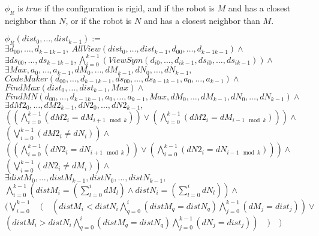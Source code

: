 \documentclass{article}
\begin{document}
$\phi_R$ is $true$ if the configuration is rigid, and if the robot is $M$ and has a closest neighbor than $N$, or if the robot is $N$ and has a closest neighbor than $M$.

\begin{center}

$\phi_R(dist_{0}, \ldots ,dist_{k-1}):=$\\
$\exists d_{00}, \ldots ,d_{k-1k-1},\ AllView(dist_{0}, \ldots ,dist_{k-1}, d_{00}, \ldots ,d_{k-1k-1})\land$\\
$\exists ds_{00}, \ldots ,ds_{k-1k-1}, \bigwedge_{i=0}^{k-1} (ViewSym(d_{i0}, \ldots , d_{ik-1}, ds_{i0}, \ldots , ds_{ik-1}))\land$\\
$\exists Max, a_{0}, \ldots , a_{k-1}, dM_{0}, \dots, dM_{k-1}, dN_{0}, \dots, dN_{k-1},$\\
$CodeMaker(d_{00}, \ldots ,d_{k-1k-1}, ds_{00}, \ldots ,ds_{k-1k-1}, a_{0}, \ldots , a_{k-1})\land$\\
$FindMax(dist_{0}, \ldots ,dist_{k-1}, Max) \land$\\
$FindMN(d_{00}, \ldots ,d_{k-1k-1}, a_{0}, \ldots , a_{k-1}, Max,  dM_{0}, \dots, dM_{k-1}, dN_{0}, \dots, dN_{k-1}) \land $\\
$\exists dM2_{0}, \dots, dM2_{k-1}, dN2_{0}, \dots, dN2_{k-1},$\\
$( (\bigwedge_{i = 0}^{k-1} (dM2_{i} = dM_{i+1 \mod{k}}) ) \lor (\bigwedge_{i = 0}^{k-1} (dM2_{i} = dM_{i-1 \mod{k}})) ) \land$\\
$(\bigvee_{i = 0}^{k-1} (dM2_{i} \not= dN_{i}) ) \land $\\
$( (\bigwedge_{i = 0}^{k-1} (dN2_{i} = dN_{i+1 \mod{k}}) ) \lor (\bigwedge_{i = 0}^{k-1} (dN2_{i} = dN_{i-1 \mod{k}})) ) \land$\\
$(\bigvee_{i = 0}^{k-1} (dN2_{i} \not= dM_{i}) ) \land $\\

$\exists distM_{0}, \ldots , distM_{k-1}, distN_{0}, \ldots , distN_{k-1},$\\
$\bigwedge_{i=0}^{k-1}(distM_{i} = (\sum_{l=0}^i dM_{l}) \land distN_{i} = (\sum_{l=0}^i dN_{l}) ) \land $\\
$(\bigvee_{i=0}^{k-1}\quad (\quad (distM_{i} < distN_{i} \bigwedge_{q=0}^{i} (distM_{q} = distN_{q}) \bigwedge_{j = 0}^{k-1} (dM_{j} = dist_{j}) ) \lor $\\
$(distM_{i} > distN_{i} \bigwedge_{q=0}^{i} (distM_{q} = distN_{q}) \bigwedge_{j = 0}^{k-1} (dN_{j} = dist_{j}) )\quad )\quad )$
\end{center}
\end{document}
